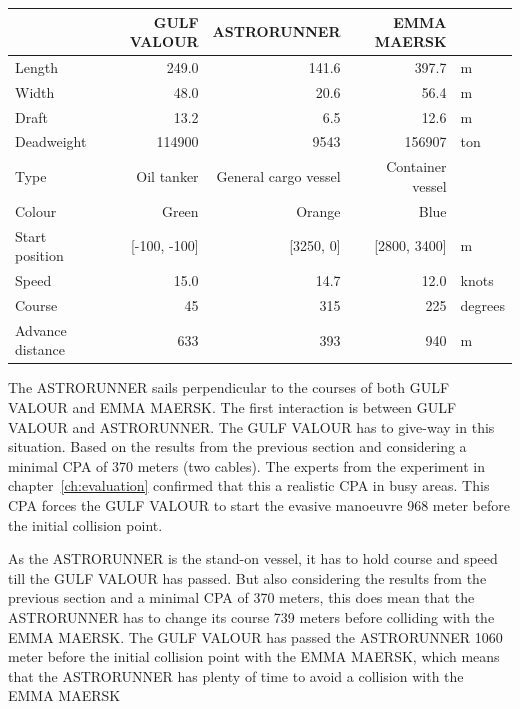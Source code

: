 \begin{table}[ht]
	\centering
	\begin{tabular}{l | r r r l}
		\toprule
		& GULF VALOUR & ASTRORUNNER & EMMA MAERSK & \\
		\midrule
		Length     & 249.0    & 141.6    &  397.7 & m \\
		Width     & 48.0    & 20.6    &  56.4 & m  \\
		Draft     & 13.2    & 6.5    &  12.6 & m  \\
		Deadweight & 114900 & 9543 & 156907 & ton \\
		Type     & Oil tanker    & General cargo vessel    &  Container vessel & \\
		Colour & Green & Orange & Blue \\
		\midrule
		Start position & [-100, -100]    & [3250, 0]    &  [2800, 3400] & m \\
		Speed     & 15.0    & 14.7    &  12.0 & knots\\
		Course     & 45    & 315    &  225 & degrees \\
		Advance distance & 633 & 393 & 940 & m \\
		\bottomrule
	\end{tabular}
	\label{tab:info-dover-MT}
\end{table}



The ASTRORUNNER sails perpendicular to the courses of both GULF VALOUR and EMMA MAERSK. The first interaction is between GULF VALOUR and ASTRORUNNER. The GULF VALOUR has to give-way in this situation. Based on the results from the previous section and considering a minimal CPA of 370 meters (two cables). The experts from the experiment in chapter~\ref{ch:evaluation} confirmed that this a realistic CPA in busy areas.
This CPA forces the GULF VALOUR to start the evasive manoeuvre 968 meter before the initial collision point. 

As the ASTRORUNNER is the stand-on vessel, it has to hold course and speed till the GULF VALOUR has passed. But also considering the results from the previous section and a minimal CPA of 370 meters, this does mean that the ASTRORUNNER has to change its course 739 meters before colliding with the EMMA MAERSK. The GULF VALOUR has passed the ASTRORUNNER 1060 meter before the initial collision point with the EMMA MAERSK, which means that the ASTRORUNNER has plenty of time to avoid a collision with the EMMA MAERSK

